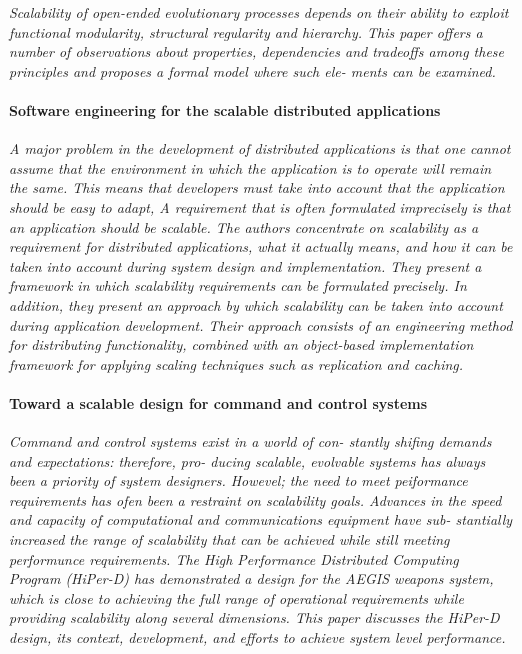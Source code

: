\documentclass{article}
\begin{document}
\emph{Scalability of open-ended evolutionary processes depends on their ability
to exploit functional modularity, structural regularity and hierarchy.  This
paper offers a number of observations about properties, dependencies and
tradeoffs among these principles and proposes a formal model where such ele-
ments can be examined.}

\paragraph{Software engineering for the scalable distributed applications}
\cite{van1998software}

\emph{A major problem in the development of distributed applications is that
one cannot assume that the environment in which the application is to operate
will remain the same. This means that developers must take into account that
the application should be easy to adapt, A requirement that is often formulated
imprecisely is that an application should be scalable. The authors concentrate
on scalability as a requirement for distributed applications, what it actually
means, and how it can be taken into account during system design and
implementation. They present a framework in which scalability requirements can
be formulated precisely. In addition, they present an approach by which
scalability can be taken into account during application development. Their
approach consists of an engineering method for distributing functionality,
combined with an object-based implementation framework for applying scaling
techniques such as replication and caching.}

\paragraph{Toward a scalable design for command and control systems}
\cite{caruso1997toward}

\emph{ Command and control systems exist in a world of con- stantly shifing
demands and expectations: therefore, pro- ducing scalable, evolvable systems
has always been a priority of system designers. Howevel; the need to meet
peiformance requirements has ofen been a restraint on scalability goals.
Advances in the speed and capacity of computational and communications
equipment have sub- stantially increased the range of scalability that can be
achieved while still meeting performunce requirements.  The High Performance
Distributed Computing Program (HiPer-D) has demonstrated a design for the AEGIS
weapons system, which is close to achieving the full range of operational
requirements while providing scalability along several dimensions. This paper
discusses the HiPer-D design, its context, development, and efforts to achieve
system level performance.}
\end{document}
